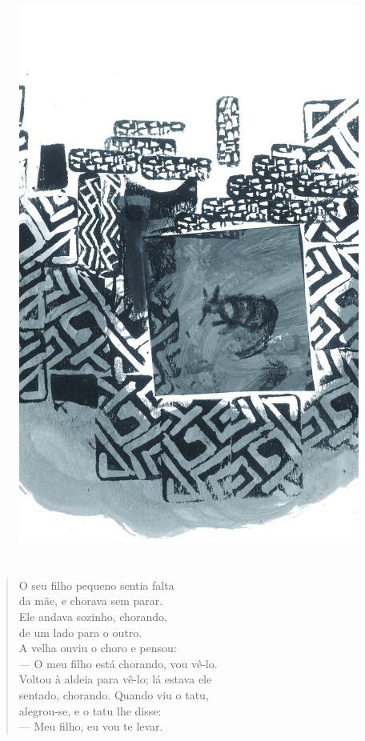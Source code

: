 \pagebreak
\thispagestyle{empty}
\begin{figure}
\vspace*{-1.6cm}
\hspace*{-2.2cm}\includegraphics[width=138mm]{./imgs/img10.jpg}
\end{figure}

\chapter*{}

\mbox{}\vspace*{\fill}

\begin{verse}
O seu filho pequeno sentia falta\\
da mãe, e chorava sem parar.\\
Ele andava sozinho, chorando,\\
de um lado para o outro.\\
A velha ouviu o choro e pensou:\\
— O meu filho está chorando, vou vê-lo.\\
Voltou à aldeia para vê-lo; lá estava ele\\
sentado, chorando. Quando viu o tatu,\\
alegrou-se, e o tatu lhe disse:\\
— Meu filho, eu vou te levar.
\end{verse}

